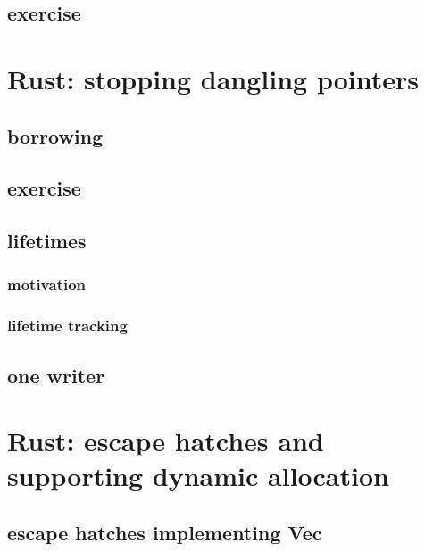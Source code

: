 \subsection{exercise}


\section{Rust: stopping dangling pointers}


\subsection{borrowing}


\subsection{exercise}


\subsection{lifetimes}

\subsubsection{motivation}


\subsubsection{lifetime tracking}


\subsection{one writer}


\section{Rust: escape hatches and supporting dynamic allocation}


\subsection{escape hatches implementing Vec}


